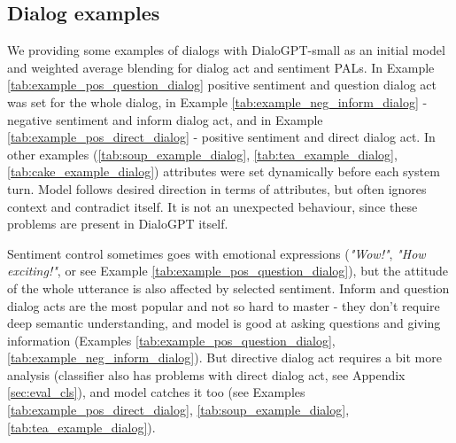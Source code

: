 \documentclass[11pt]{article}
\begin{document}
\subsection{Dialog examples}
\label{sec:dialog_examples}

We providing some examples of dialogs with DialoGPT-small as an initial model and weighted average blending for dialog act and sentiment PALs. In Example \ref{tab:example_pos_question_dialog} positive sentiment and question dialog act was set for the whole dialog, in Example \ref{tab:example_neg_inform_dialog} - negative sentiment and inform dialog act, and in Example \ref{tab:example_pos_direct_dialog} - positive sentiment and direct dialog act. In other examples (\ref{tab:soup_example_dialog}, \ref{tab:tea_example_dialog}, \ref{tab:cake_example_dialog}) attributes were set dynamically before each system turn. Model follows desired direction in terms of attributes, but often ignores context and contradict itself. It is not an unexpected behaviour, since these problems are present in DialoGPT itself.

Sentiment control sometimes goes with emotional expressions (\textit{"Wow!"}, \textit{"How exciting!"}, or see Example \ref{tab:example_pos_question_dialog}), but the attitude of the whole utterance is also affected by selected sentiment. Inform and question dialog acts are the most popular and not so hard to master - they don't require deep semantic understanding, and model is good at asking questions and giving information (Examples \ref{tab:example_pos_question_dialog}, \ref{tab:example_neg_inform_dialog}). But directive dialog act requires a bit more analysis (classifier also has problems with direct dialog act, see Appendix \ref{sec:eval_cls}), and model catches it too (see Examples \ref{tab:example_pos_direct_dialog}, \ref{tab:soup_example_dialog}, \ref{tab:tea_example_dialog}). 
\end{document}
